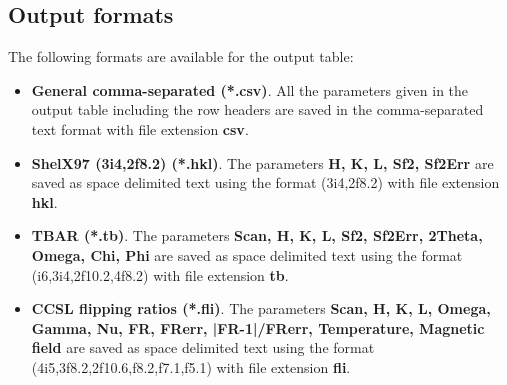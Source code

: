 \subsection{Output formats}

The following formats are available for the output table:

\begin{itemize}
	\item \textbf{General comma-separated (*.csv)}. All the parameters given in the output table including the row headers are saved in the comma-separated text format with file extension \textbf{csv}.
	\item \textbf{ShelX97 (3i4,2f8.2) (*.hkl)}. The parameters \textbf{H, K, L, Sf2, Sf2Err} are saved as space delimited text using the format (3i4,2f8.2) with file extension \textbf{hkl}.
	\item \textbf{TBAR (*.tb)}. The parameters \textbf{Scan, H, K, L, Sf2, Sf2Err, 2Theta, Omega, Chi, Phi} are saved as space delimited text using the format (i6,3i4,2f10.2,4f8.2) with file extension \textbf{tb}.
	\item \textbf{CCSL flipping ratios (*.fli)}. The parameters \textbf{Scan, H, K, L, Omega, Gamma, Nu, FR, FRerr, |FR-1|/FRerr, Temperature, Magnetic field} are saved as space delimited text using the format (4i5,3f8.2,2f10.6,f8.2,f7.1,f5.1) with file extension \textbf{fli}.
\end{itemize}



